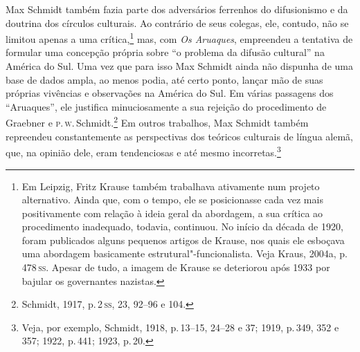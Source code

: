 Max Schmidt também fazia parte dos adversários ferrenhos do
difusionismo e da doutrina dos círculos culturais. Ao contrário de seus
colegas, ele, contudo, não se limitou apenas a uma crítica,\footnote{Em
  Leipzig, Fritz Krause também trabalhava ativamente num projeto
  alternativo. Ainda que, com o tempo, ele se posicionasse cada vez mais
  positivamente com relação à ideia geral da abordagem, a sua crítica ao
  procedimento inadequado, todavia, continuou. No início da década de
  1920, foram publicados alguns pequenos artigos de Krause, nos quais
  ele esboçava uma abordagem basicamente estrutural"-funcionalista. Veja
  Kraus, 2004a, p.\,478\,\textsc{ss}. Apesar de tudo, a imagem de Krause se
  deteriorou após 1933 por bajular os governantes nazistas.} mas, com
\textit{Os Aruaques}, empreendeu a tentativa de formular uma concepção
própria sobre ``o problema da difusão cultural'' na América do Sul. Uma
vez que para isso Max Schmidt ainda não dispunha de uma base de dados
ampla, ao menos podia, até certo ponto, lançar mão de suas próprias
vivências e observações na América do Sul. Em várias passagens dos
``Aruaques'', ele justifica minuciosamente a sua rejeição do
procedimento de Graebner e \textsc{p}.\,\textsc{w}.\,Schmidt.\footnote{Schmidt, 1917, p.\,2\,\textsc{ss}, 
23, 92--96 e 104.} Em %
outros trabalhos, Max Schmidt também repreendeu constantemente as
perspectivas dos teóricos culturais de língua alemã, que, na opinião
dele, eram tendenciosas e até mesmo incorretas.\footnote{Veja, por
  exemplo, Schmidt, 1918, p.\,13--15, 24--28 e 37; 1919, p.\,349, 352 e 357;
  1922, p.\,441; 1923, p.\,20.}

